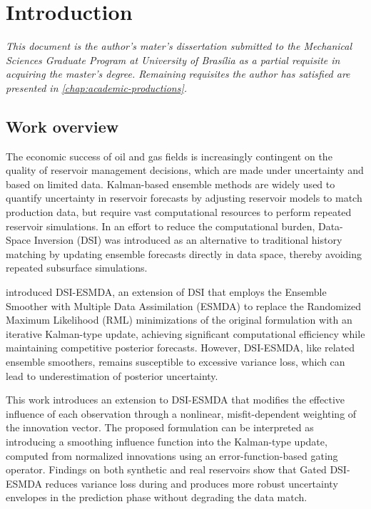 \chapter{Introduction}
\label{chap:introduction}

\textit{%
    This document is the author's mater's dissertation submitted to the 
    Mechanical Sciences Graduate Program at University of Brasília as a 
    partial requisite in acquiring the master's degree.
    Remaining requisites the author has satisfied are presented in \cref{chap:academic-productions}.
}

\section{Work overview}

    The economic success of oil and gas fields is increasingly contingent on the quality of reservoir management decisions, 
    which are made under uncertainty and based on limited data.
    Kalman-based ensemble methods 
    \cite{Evensen:1994,Leeuwen:1996, Emerick:2013:CompGeosci, Skjervheim:2011}
    are widely used to quantify uncertainty in reservoir forecasts by adjusting reservoir models to match production data, 
    but require vast computational resources to perform repeated reservoir simulations.
    In an effort to reduce the computational burden, Data-Space Inversion (DSI) 
    \cite{Sun:2017}
    was introduced as an alternative to traditional history matching by updating ensemble forecasts directly in data space, 
    thereby avoiding repeated subsurface simulations.
    
     introduced DSI-ESMDA, an extension of DSI that employs the 
    Ensemble Smoother with Multiple Data Assimilation (ESMDA) 
    \cite{Emerick:2013:CompGeosci}
    to replace the Randomized Maximum Likelihood (RML) minimizations of the original formulation with an iterative Kalman-type update, 
    achieving significant computational efficiency while maintaining competitive posterior forecasts.
    However, DSI-ESMDA, like related ensemble smoothers, remains susceptible to excessive variance loss, 
    which can lead to underestimation of posterior uncertainty.
    
    This work introduces an extension to DSI-ESMDA that modifies the effective influence of each observation through a
    nonlinear, misfit-dependent weighting of the innovation vector.
    The proposed formulation can be interpreted as introducing a smoothing influence function into the Kalman-type update,
    computed from normalized innovations using an error-function-based gating operator.
    Findings on both synthetic and real reservoirs show that Gated DSI-ESMDA reduces variance loss during 
    and produces more robust uncertainty envelopes in the prediction phase without degrading the data match.
    

